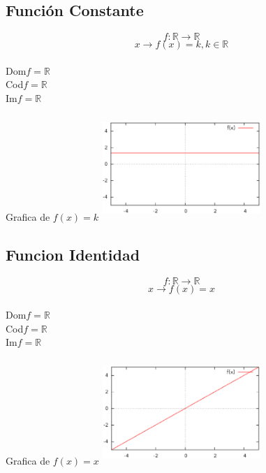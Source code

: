 \subsection{Función Constante}
\hfill
\begin{minipage}{.45\textwidth}
$$f:\mathbb{R} \longrightarrow \mathbb{R}$$
$$x \longrightarrow f(x)= k, k \in \mathbb{R}$$\\
Dom$f = \mathbb{R}$\\
Cod$f = \mathbb{R}$\\
Im$f = \mathbb{R}$\\
\end{minipage}
\hfill
\begin{minipage}{.45\textwidth}
\begin{center}
Grafica de $f(x)= k$
\includegraphics[height=4cm,width=6cm]{fconst.eps} 
\end{center}
\end{minipage}
\hfill
\subsection{Funcion Identidad}
\hfill
\begin{minipage}{.45\textwidth}
$$f:\mathbb{R} \longrightarrow \mathbb{R}$$
$$x \longrightarrow f(x)= x$$\\
Dom$f = \mathbb{R}$\\
Cod$f = \mathbb{R}$\\
Im$f = \mathbb{R}$\\
\end{minipage}
\hfill
\begin{minipage}{.45\textwidth}
\begin{center}
Grafica de $f(x)= x$
\includegraphics[height=4cm,width=6cm]{fid.eps} 
\end{center}
\end{minipage}
\hfill
